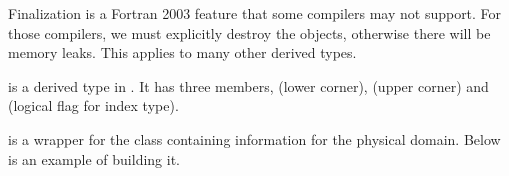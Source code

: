 \documentclass[letterpaper,10pt,english]{sphinxmanual}
\begin{document}
\begin{sphinxVerbatim}[commandchars=\\\{\}]
  
   
 
   
 
 
\end{sphinxVerbatim}

\sphinxAtStartPar
Finalization is a Fortran 2003 feature that some compilers may not support. For
those compilers, we must explicitly destroy the objects, otherwise there will
be memory leaks. This applies to many other derived types.

\sphinxAtStartPar
{} is a derived type in 
. It has three members, 
(lower corner),  (upper corner) and  (logical flag
for index type).

\sphinxAtStartPar
{} is a wrapper for the  class
containing information for the physical domain. Below is an example
of building it.
\end{document}
